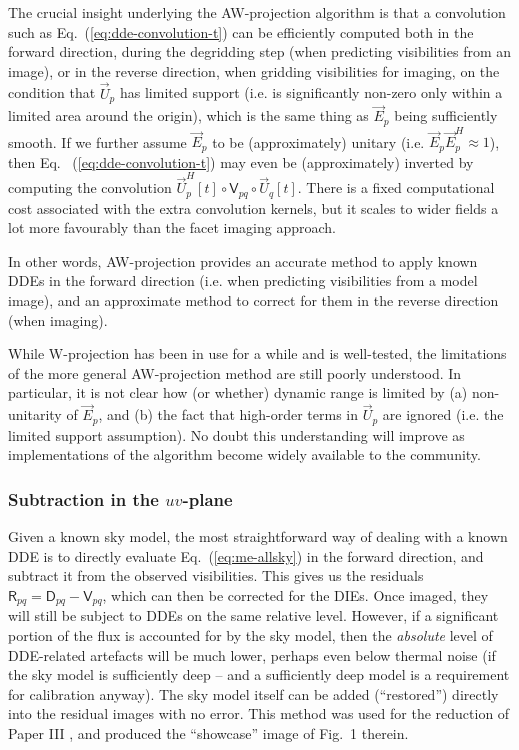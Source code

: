 \documentclass{aa}
\newcommand{\herm}{H}
\newcommand{\jones}[2]{\vec {#1}_{#2}}
\newcommand{\jonesT}[2]{\vec {#1}^{\herm}_{#2}}
\newcommand{\coh}[2]{\mathsf{{#1}}_{{#2}}}
\begin{document}
The crucial insight underlying the AW-projection algorithm is that a convolution such as Eq.~(\ref{eq:dde-convolution-t}) can be efficiently computed both in the forward direction, during the degridding step (when predicting visibilities from an image), or in the reverse direction, when gridding visibilities for imaging, on the condition that $\jones{U}{p}$ has limited support (i.e. is significantly non-zero only within a limited area around the origin), which is the same thing as $\jones{E}{p}$ being sufficiently smooth. If we further assume $\jones{E}{p}$ to be (approximately) unitary (i.e. $\jones{E}{p}\jonesT{E}{p}\approx1$), then Eq. ~(\ref{eq:dde-convolution-t}) may even be (approximately) inverted by computing the convolution $\jonesT{U}{p}[t] \circ \coh{V}{pq} \circ \jones{U}{q}[t]$. There is a fixed computational cost associated with the extra convolution kernels, but it scales to wider fields a lot more favourably than the facet imaging approach.

In other words, AW-projection provides an accurate method to apply known DDEs in the forward direction (i.e. when predicting visibilities from a model image), and an approximate method to correct for them in the reverse direction (when imaging).

While W-projection has been in use for a while and is well-tested, the limitations of the more general AW-projection method are still poorly understood. In particular, it is not clear how (or whether) dynamic range is limited by (a) non-unitarity of $\jones{E}{p}$, and (b) the fact that high-order terms in $\jones{U}{p}$ are ignored (i.e. the limited support assumption). No doubt this understanding will improve as implementations of the algorithm become widely available to the community.

\subsubsection{Subtraction in the $uv$-plane\label{sec:subtraction-uv-plane}}

Given a known sky model, the most straightforward way of dealing with a known DDE is to directly evaluate Eq.~(\ref{eq:me-allsky}) in the forward direction, and subtract it from the observed visibilities. This gives us the residuals $\coh{R}{pq} = \coh{D}{pq} - \coh{V}{pq}$, which can then be corrected for the DIEs. Once imaged, they will still be subject to DDEs on the same relative level. However, if a significant portion of the flux is accounted for by the sky model, then the \emph{absolute} level of DDE-related artefacts will be much lower, perhaps even below thermal noise (if the sky model is sufficiently deep -- and a sufficiently deep model is a requirement for calibration anyway). The sky model itself can be added (``restored'') directly into the residual images with no error. This method was used for the reduction of Paper III \citep{RRIME3}, and produced the ``showcase'' image of Fig.~1 therein.
\end{document}
